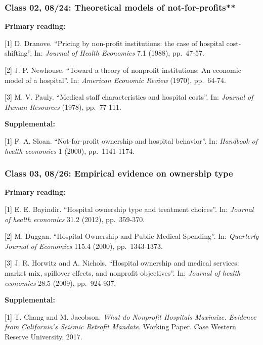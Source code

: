 \documentclass[11pt,]{article}
\begin{document}
\hypertarget{class-02-0824-theoretical-models-of-not-for-profits}{%
\subsubsection{Class 02, 08/24: Theoretical models of
not-for-profits**}\label{class-02-0824-theoretical-models-of-not-for-profits}}

\textbf{Primary reading:}

{[}1{]} D. Dranove. ``Pricing by non-profit institutions: the case of
hospital cost-shifting''. In: \emph{Journal of Health Economics} 7.1
(1988), pp.~47-57.

{[}2{]} J. P. Newhouse. ``Toward a theory of nonprofit institutions: An
economic model of a hospital''. In: \emph{American Economic Review}
(1970), pp.~64-74.

{[}3{]} M. V. Pauly. ``Medical staff characteristics and hospital
costs''. In: \emph{Journal of Human Resources} (1978), pp.~77-111.

\textbf{Supplemental:}

{[}1{]} F. A. Sloan. ``Not-for-profit ownership and hospital behavior''.
In: \emph{Handbook of health economics} 1 (2000), pp.~1141-1174.

\hypertarget{class-03-0826-empirical-evidence-on-ownership-type}{%
\subsubsection{Class 03, 08/26: Empirical evidence on ownership
type}\label{class-03-0826-empirical-evidence-on-ownership-type}}

\textbf{Primary reading:}

{[}1{]} E. E. Bayindir. ``Hospital ownership type and treatment
choices''. In: \emph{Journal of health economics} 31.2 (2012),
pp.~359-370.

{[}2{]} M. Duggan. ``Hospital Ownership and Public Medical Spending''.
In: \emph{Quarterly Journal of Economics} 115.4 (2000), pp.~1343-1373.

{[}3{]} J. R. Horwitz and A. Nichols. ``Hospital ownership and medical
services: market mix, spillover effects, and nonprofit objectives''. In:
\emph{Journal of health economics} 28.5 (2009), pp.~924-937.

\textbf{Supplemental:}

{[}1{]} T. Chang and M. Jacobson. \emph{What do Nonprofit Hospitals
Maximize. Evidence from California's Seismic Retrofit Mandate}. Working
Paper. Case Western Reserve University, 2017.
\end{document}
